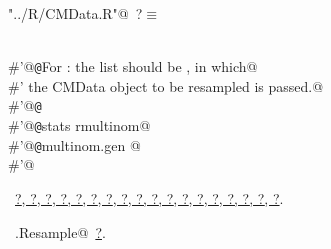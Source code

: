 \documentclass[reqno]{amsart}
\renewcommand{\NWtarget}[2]{\hypertarget{#1}{#2}}
\renewcommand{\NWlink}[2]{\hyperlink{#1}{#2}}
\begin{document}
\begin{flushleft} \small\label{scrap11}\raggedright\small
\NWtarget{nuweb?}{} \verb@"../R/CMData.R"@\nobreak\ {\footnotesize {?}}$\equiv$
\vspace{-1ex}
\begin{list}{}{} \item
\mbox{}\verb@@\\
\mbox{}\verb@#'@{\tt @}\verb@details For : the  list should be , in which@\\
\mbox{}\verb@#' the CMData object to be resampled is passed.@\\
\mbox{}\verb@#'@{\tt @}\verb@export@\\
\mbox{}\verb@#'@{\tt @}\verb@importFrom stats rmultinom@\\
\mbox{}\verb@#'@{\tt @}\verb@rdname multinom.gen @\\
\mbox{}\verb@#'@\\
\mbox{}\verb@@{\NWsep}
\end{list}
\vspace{-1.5ex}
\footnotesize
\begin{list}{}{\setlength{\itemsep}{-\parsep}\setlength{\itemindent}{-\leftmargin}}
\item \NWtxtFileDefBy\ \NWlink{nuweb?}{?}\NWlink{nuweb?}{, ?}\NWlink{nuweb?}{, ?}\NWlink{nuweb?}{, ?}\NWlink{nuweb?}{, ?}\NWlink{nuweb?}{, ?}\NWlink{nuweb?}{, ?}\NWlink{nuweb?}{, ?}\NWlink{nuweb?}{, ?}\NWlink{nuweb?}{, ?}\NWlink{nuweb?}{, ?}\NWlink{nuweb?}{, ?}\NWlink{nuweb?}{, ?}\NWlink{nuweb?}{, ?}\NWlink{nuweb?}{, ?}\NWlink{nuweb?}{, ?}\NWlink{nuweb?}{, ?}\NWlink{nuweb?}{, ?}.
\item \NWtxtIdentsUsed\nobreak\  \verb@mg.Resample@\nobreak\ \NWlink{nuweb?}{?}.
\item{}
\end{list}
\vspace{4ex}
\end{flushleft}
\end{document}
